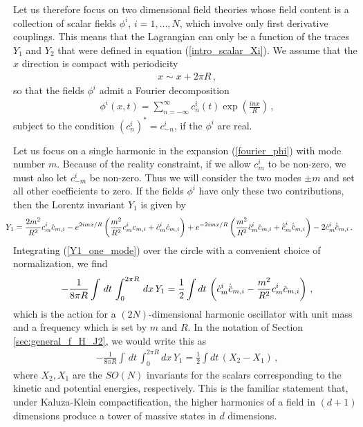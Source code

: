 \documentclass[12pt]{article}
\numberwithin{equation}{section}
\newcommand{\overbar}[1]{\mkern 1.5mu\overline{\mkern-1.5mu#1\mkern-1.5mu}\mkern 1.5mu}
\def\cbar{{\overbar{c}}}
\begin{document}
Let us therefore focus on two dimensional field theories whose field content is a collection of scalar fields $\phi^i$, $i = 1 , \ldots , N$, which involve only first derivative couplings. This means that the Lagrangian can only be a function of the traces $Y_1$ and $Y_2$ that were defined in equation (\ref{intro_scalar_Xi}). We assume that the $x$ direction is compact with periodicity
%
\begin{align}
    x \sim x + 2 \pi R \, , 
\end{align}
%
so that the fields $\phi^i$ admit a Fourier decomposition
%
\begin{align}\label{fourier_phi}
    \phi^i ( x, t ) = \sum_{n = - \infty}^{\infty} c^i_n ( t ) \exp \left( \frac{i n x}{R} \right) \, ,
\end{align}
%
subject to the condition $\left( c_n^i \right)^\ast = c_{-n}^i$, if the $\phi^i$ are real.

Let us focus on a single harmonic in the expansion (\ref{fourier_phi}) with mode number $m$. Because of the reality constraint, if we allow $c_m^i$ to be non-zero, we must also let $c_{-m}^i$ be non-zero. Thus we will consider the two modes $\pm m$ and set all other coefficients to zero. If the fields $\phi^i$ have only these two contributions, then the Lorentz invariant $Y_1$ is given by
%
\begin{align}\label{Y1_one_mode}\hspace{-10pt}
    Y_1 &= \frac{2 m^2}{R^2} c_m^i \cbar_{m, i} - e^{2 i m x / R} \left( \frac{m^2}{R^2} c_m^i c_{m, i} + \dot{c}_m^i \dot{c}_{m, i} \right)  + e^{-2 i m x / R} \left( \frac{m^2}{R^2} \cbar_m^i \cbar_{m, i} + \dot{\cbar}_m^i \dot{\cbar}_{m, i} \right) - 2 \dot{c}_m^i \dot{\cbar}_{m, i} \, .
\end{align}
%
Integrating (\ref{Y1_one_mode}) over the circle with a convenient choice of normalization, we find
%
\begin{align}
    - \frac{1}{8 \pi R} \int \, dt \, \int_{0}^{2 \pi R} \, dx \, Y_1 = \frac{1}{2} \int dt \, \left( \dot{c}_m^i \dot{\cbar}_{m, i} - \frac{m^2}{R^2} c_m^i \cbar_{m, i} \right) \, , 
\end{align}
%
which is the action for a $(2N)$-dimensional harmonic oscillator with unit mass and a frequency which is set by $m$ and $R$. In the notation of Section \ref{sec:general_f_H_J2}, we would write this as
%
\begin{align}
    - \frac{1}{8 \pi R} \int \, dt \, \int_{0}^{2 \pi R} dx \, Y_1 = \frac{1}{2} \int dt \, \left( X_2 - X_1 \right) \, , 
\end{align}
%
where $X_2, X_1$ are the $SO(N)$ invariants for the scalars corresponding to the kinetic and potential energies, respectively. This is the familiar statement that, under Kaluza-Klein compactification, the higher harmonics of a field in $(d+1)$ dimensions produce a tower of massive states in $d$ dimensions.
\end{document}
